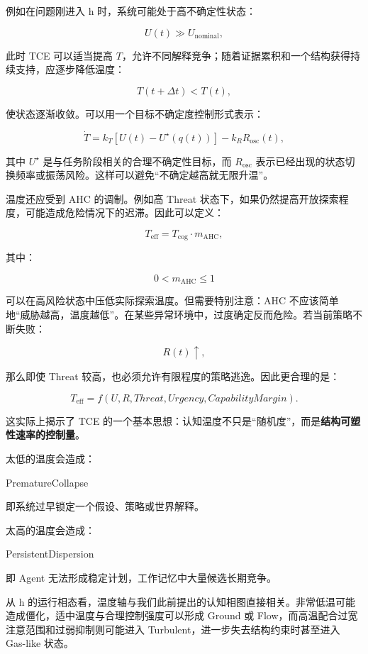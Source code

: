 例如在问题刚进入 h 时，系统可能处于高不确定性状态：

\[
U(t)\gg U_{\mathrm{nominal}},
\]

此时 TCE 可以适当提高 $T$，允许不同解释竞争；随着证据累积和一个结构获得持续支持，应逐步降低温度：

\[
T(t+\Delta t)<T(t),
\]

使状态逐渐收敛。可以用一个目标不确定度控制形式表示：

\[
\dot T
=
k_T
\left[
U(t)-U^\star(q(t))
\right]
-
k_R R_{\mathrm{osc}}(t),
\]

其中 $U^\star$ 是与任务阶段相关的合理不确定性目标，而 $R_{\mathrm{osc}}$ 表示已经出现的状态切换频率或振荡风险。这样可以避免“不确定越高就无限升温”。

温度还应受到 AHC 的调制。例如高 Threat 状态下，如果仍然提高开放探索程度，可能造成危险情况下的迟滞。因此可以定义：

\[
T_{\mathrm{eff}}
=
T_{\mathrm{cog}}
\cdot
m_{\mathrm{AHC}},
\]

其中：

\[
0<m_{\mathrm{AHC}}\le 1
\]

可以在高风险状态中压低实际探索温度。但需要特别注意：AHC 不应该简单地“威胁越高，温度越低”。在某些异常环境中，过度确定反而危险。若当前策略不断失败：

\[
R(t)\uparrow,
\]

那么即使 Threat 较高，也必须允许有限程度的策略逃逸。因此更合理的是：

\[
T_{\mathrm{eff}}
=
f(
U,
R,
Threat,
Urgency,
CapabilityMargin
).
\]

这实际上揭示了 TCE 的一个基本思想：认知温度不只是“随机度”，而是\textbf{结构可塑性速率的控制量}。

太低的温度会造成：

\begin{statementbox}
PrematureCollapse
\end{statementbox}

即系统过早锁定一个假设、策略或世界解释。

太高的温度会造成：

\begin{statementbox}
PersistentDispersion
\end{statementbox}

即 Agent 无法形成稳定计划，工作记忆中大量候选长期竞争。

从 h 的运行相态看，温度轴与我们此前提出的认知相图直接相关。非常低温可能造成僵化，适中温度与合理控制强度可以形成 Ground 或 Flow，而高温配合过宽注意范围和过弱抑制则可能进入 Turbulent，进一步失去结构约束时甚至进入 Gas-like 状态。

